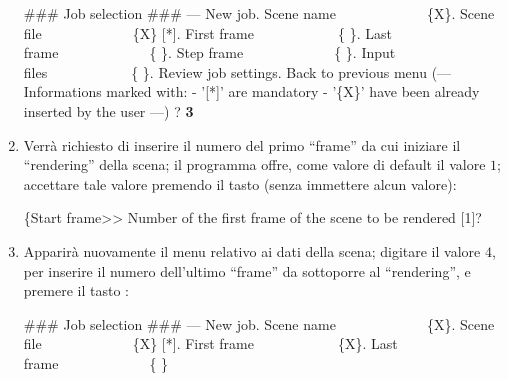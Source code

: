 \begin{enumerate}
\begin{mgCodeBox}
\small
\#\#\# Job selection \#\#\#\newline
--- New job. Scene name\ \ \ \ \ \ \ \ \ \ \ \ \ \{X\}. Scene file\ \ \ \ \ \ \ \ \ \ \ \ \ \{X\} [*]. First frame\ \ \ \ \ \ \ \ \ \ \ \ \{ \}. Last frame\ \ \ \ \ \ \ \ \ \ \ \ \ \{ \}. Step frame\ \ \ \ \ \ \ \ \ \ \ \ \ \{ \}. Input files\ \ \ \ \ \ \ \ \ \ \ \ \{ \}. Review job settings. Back to previous menu\newline
(---\newline
 Informations marked with:\newline
 - '[*]' are mandatory\newline
 - '\{X\}' have been already inserted by the user\newline
---)\newline
? \textbf{3}
\end{mgCodeBox}
\item \label{lbl:exec-victor-startframe2-useless} Verr\`a richiesto di inserire il numero del primo ``frame'' da cui iniziare il ``rendering'' della scena; il programma offre, come valore di default il valore $1$; accettare tale valore premendo il tasto  (senza immettere alcun valore):
\begin{mgCodeBox}
\small
\{Start frame>> Number of the first frame of the scene to be rendered [1]?
\end{mgCodeBox}
\item Apparir\`a nuovamente il menu relativo ai dati della scena; digitare il valore $4$, per inserire il numero dell'ultimo ``frame'' da sottoporre al ``rendering'', e premere il tasto :
\begin{mgCodeBox}
\small
\#\#\# Job selection \#\#\#\newline
--- New job. Scene name\ \ \ \ \ \ \ \ \ \ \ \ \ \{X\}. Scene file\ \ \ \ \ \ \ \ \ \ \ \ \ \{X\} [*]. First frame\ \ \ \ \ \ \ \ \ \ \ \ \{X\}. Last frame\ \ \ \ \ \ \ \ \ \ \ \ \ \{ \}\newline

\end{mgCodeBox}
\end{enumerate}

